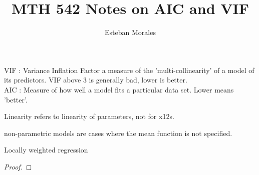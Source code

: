 \documentclass[12pt]{article}
\newenvironment{statement}[2][Section]{\begin{trivlist}
\item[\hskip \labelsep {\bfseries #1}\hskip \labelsep {\bfseries #2.}]}{\end{trivlist}}
\begin{document}
 
%
%
 
\title{MTH 542 Notes on AIC and VIF } %
\author{Esteban Morales} %
\maketitle


\begin{statement}{x.yz} %
VIF : Variance Inflation Factor
a measure of the 'multi-collinearity' of a model of its predictors.
VIF above 3 is generally bad, lower is better.\\





AIC : Measure of how well a model fits a particular data set. Lower means 'better'.



Linearity refers to linearity of parameters, not for x12s.

non-parametric models are cases where the mean function is not specified.

Locally weighted regression

\end{statement}
 
\begin{proof}  

\end{proof}
 








 
\end{document}
